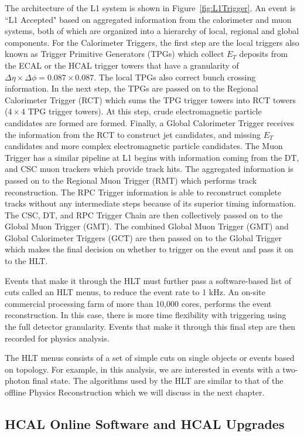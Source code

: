 The architecture of the L1 system is shown in Figure~\ref{fig:L1Trigger}. An event is ``L1 Accepted" based on aggregated information from the calorimeter and muon systems, both of which are organized into a hierarchy of local, regional and global components. For the Calorimeter Triggers, the first step are the local triggers also known as Trigger Primitive Generators (TPGs) which collect $E_{T}$ deposits from the ECAL or the HCAL trigger towers that have a granularity of $\Delta \eta \times \Delta \phi= 0.087 \times 0.087$. The local TPGs also correct bunch crossing information. In the next step, the TPGs are passed on to the Regional Calorimeter Trigger (RCT) which sums the TPG trigger towers into RCT towers ($4 \times 4$ TPG trigger towers). At this step, crude electromagnetic particle candidates are formed are formed. Finally, a Global Calorimeter Trigger receives the information from the RCT to construct jet candidates, and missing $E_{T}$ candidates and more complex electromagnetic particle candidates. The Muon Trigger has a similar pipeline at L1 begins with information coming from the DT, and CSC muon trackers which provide track hits. The aggregated information is passed on to the Regional Muon Trigger (RMT) which performs track reconstruction. The RPC Trigger information is able to reconstruct complete tracks without any intermediate steps because of its superior timing information. The CSC, DT, and RPC  Trigger Chain are then collectively passed on to the Global Muon Trigger (GMT). The combined Global Muon Trigger (GMT) and Global Calorimeter Triggers (GCT) are then passed on to the Global Trigger which makes the final decision on whether to trigger on the event and pass it on to the HLT.

Events that make it through the HLT must further pass a software-based list of cuts called an HLT menus, to reduce the event rate to 1 kHz. An on-site commercial processing farm of more than 10,000 cores, performs the event reconstruction. In this case, there is more time flexibility with triggering using the full detector granularity. Events that make it through this final step are then recorded for physics analysis. 

The HLT menus consists of a set of simple cuts on single objects or events based on topology. For example, in this analysis, we are interested in events with a two-photon final state. The algorithms used by the HLT are similar to that of the offline Physics Reconstruction which we will discuss in the next chapter. 

\subsection{HCAL Online Software and HCAL Upgrades}

